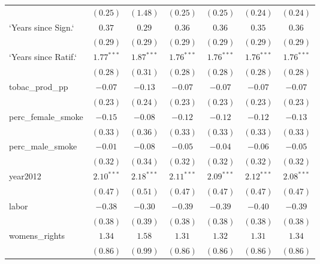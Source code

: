 \begin{table}[!h]
\begin{center}
\begin{tabular}{l c c c c c c }
                        & $(0.25)$     & $(1.48)$     & $(0.25)$     & $(0.25)$     & $(0.24)$     & $(0.24)$     \\
`Years since Sign.`     & $0.37$       & $0.29$       & $0.36$       & $0.36$       & $0.35$       & $0.36$       \\
                        & $(0.29)$     & $(0.29)$     & $(0.29)$     & $(0.29)$     & $(0.29)$     & $(0.29)$     \\
`Years since Ratif.`    & $1.77^{***}$ & $1.87^{***}$ & $1.76^{***}$ & $1.76^{***}$ & $1.76^{***}$ & $1.76^{***}$ \\
                        & $(0.28)$     & $(0.31)$     & $(0.28)$     & $(0.28)$     & $(0.28)$     & $(0.28)$     \\
tobac\_prod\_pp         & $-0.07$      & $-0.13$      & $-0.07$      & $-0.07$      & $-0.07$      & $-0.07$      \\
                        & $(0.23)$     & $(0.24)$     & $(0.23)$     & $(0.23)$     & $(0.23)$     & $(0.23)$     \\
perc\_female\_smoke     & $-0.15$      & $-0.08$      & $-0.12$      & $-0.12$      & $-0.12$      & $-0.13$      \\
                        & $(0.33)$     & $(0.36)$     & $(0.33)$     & $(0.33)$     & $(0.33)$     & $(0.33)$     \\
perc\_male\_smoke       & $-0.01$      & $-0.08$      & $-0.05$      & $-0.04$      & $-0.06$      & $-0.05$      \\
                        & $(0.32)$     & $(0.34)$     & $(0.32)$     & $(0.32)$     & $(0.32)$     & $(0.32)$     \\
year2012                & $2.10^{***}$ & $2.18^{***}$ & $2.11^{***}$ & $2.09^{***}$ & $2.12^{***}$ & $2.08^{***}$ \\
                        & $(0.47)$     & $(0.51)$     & $(0.47)$     & $(0.47)$     & $(0.47)$     & $(0.47)$     \\
labor                   & $-0.38$      & $-0.30$      & $-0.39$      & $-0.39$      & $-0.40$      & $-0.39$      \\
                        & $(0.38)$     & $(0.39)$     & $(0.38)$     & $(0.38)$     & $(0.38)$     & $(0.38)$     \\
womens\_rights          & $1.34$       & $1.58$       & $1.31$       & $1.32$       & $1.31$       & $1.34$       \\
                        & $(0.86)$     & $(0.99)$     & $(0.86)$     & $(0.86)$     & $(0.86)$     & $(0.86)$     \\

\end{tabular}
\end{center}
\end{table}
